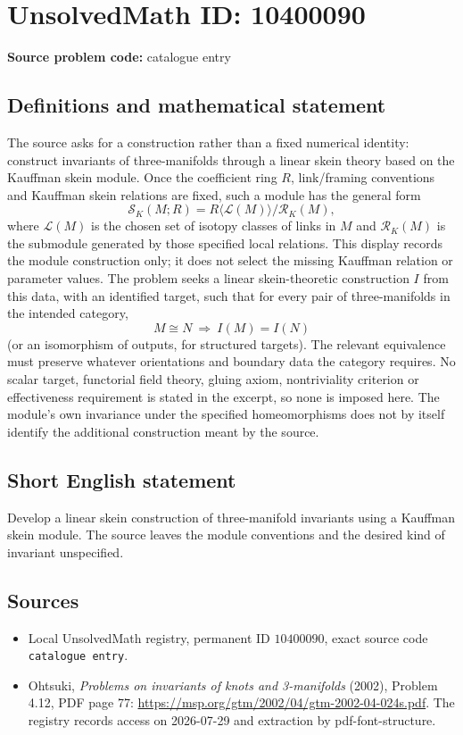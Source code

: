 \documentclass[11pt]{article}
\begin{document}
\section*{UnsolvedMath ID: 10400090}
\textbf{Source problem code:} catalogue entry
\subsection{Definitions and mathematical statement}
The source asks for a construction rather than a fixed numerical identity: construct invariants of three-manifolds through a linear skein theory based on the Kauffman skein module. Once the coefficient ring \(R\), link/framing conventions and Kauffman skein relations are fixed, such a module has the general form \[ \mathcal S_K(M;R)=R\langle\mathcal L(M)\rangle/\mathcal R_K(M), \] where \(\mathcal L(M)\) is the chosen set of isotopy classes of links in \(M\) and \(\mathcal R_K(M)\) is the submodule generated by those specified local relations. This display records the module construction only; it does not select the missing Kauffman relation or parameter values. The problem seeks a linear skein-theoretic construction \(I\) from this data, with an identified target, such that for every pair of three-manifolds in the intended category, \[ M\cong N\ \Longrightarrow\ I(M)=I(N) \] (or an isomorphism of outputs, for structured targets). The relevant equivalence must preserve whatever orientations and boundary data the category requires. No scalar target, functorial field theory, gluing axiom, nontriviality criterion or effectiveness requirement is stated in the excerpt, so none is imposed here. The module's own invariance under the specified homeomorphisms does not by itself identify the additional construction meant by the source.
\subsection{Short English statement}
Develop a linear skein construction of three-manifold invariants using a Kauffman skein module. The source leaves the module conventions and the desired kind of invariant unspecified.
\subsection{Sources}
\begin{itemize}
\item Local UnsolvedMath registry, permanent ID \(10400090\), exact source code \texttt{catalogue entry}.
\item Ohtsuki, \emph{Problems on invariants of knots and 3-manifolds} (2002), Problem 4.12, PDF page 77: \url{https://msp.org/gtm/2002/04/gtm-2002-04-024s.pdf}. The registry records access on 2026-07-29 and extraction by pdf-font-structure.
\end{itemize}
\end{document}
